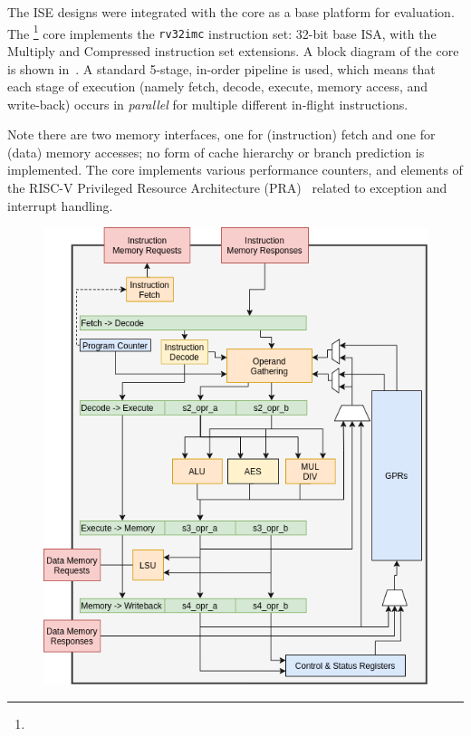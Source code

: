 

The ISE designs were integrated with the  core as a base platform
for evaluation.
The \footnote{%
} core
implements the {\tt rv32imc} instruction set: 32-bit base ISA, with the
Multiply and Compressed instruction set extensions.
A block diagram of the core is shown in~.
A standard 5-stage, in-order pipeline is used, which
means that each stage of execution
(namely fetch, decode, execute, memory access, and write-back)
occurs in {\em parallel} for multiple different in-flight instructions.

Note there are two memory interfaces, one for (instruction) fetch and one for
(data) memory accesses;
no form of cache hierarchy or branch prediction is implemented.
The core implements various performance counters,
and
elements of the
RISC-V Privileged Resource Architecture (PRA)~\cite[Chapter 3]{RV:ISA:II:17}
related to exception and interrupt handling.

\begin{figure}
\centering
\includegraphics[scale=0.5,angle=90]{diagrams/scarv-cpu-uarch.png}
\label{fig:design:cpu_block:2}
\end{figure}
